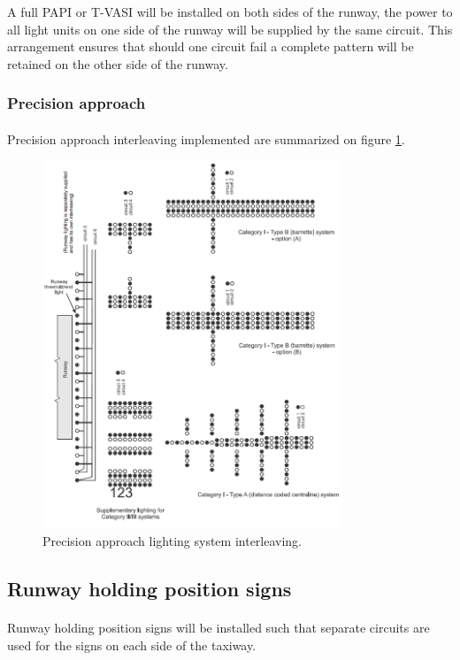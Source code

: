 			A full PAPI or T-VASI will be installed on both sides of the runway, the power to all light units on one side of the runway will be supplied by the same circuit. This arrangement ensures that should one circuit fail a complete pattern will be retained on the other side of the runway.
					
			
			\subsubsection{Precision approach}
			\paragraph{} Precision approach interleaving implemented are summarized on figure \ref{pApp}.
			\begin{figure}[H]
				\centering
				\includegraphics[clip, trim=0cm 0cm 0cm 0cm, width=0.8\textwidth]{./images/electric/pApp}
				\caption{Precision approach lighting system interleaving.}
				\label{pApp}
			\end{figure}
			
		\subsection{Runway holding position signs}
		\paragraph{} Runway holding position signs will be installed such that separate circuits are used for the signs on each side of the taxiway.
		
